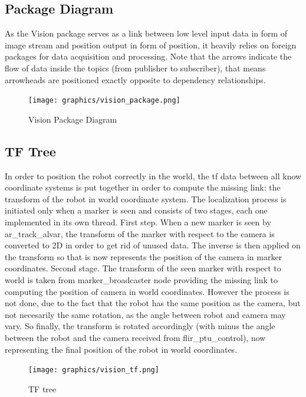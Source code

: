 \subsection{Package Diagram}
As the Vision package serves as a link between low level input data in form of image stream and position output in form of position, it heavily relies on foreign packages for data acquisition and processing. Note that the arrows indicate the flow of data inside the topics (from publisher to subscriber), that means arrowheads are positioned exactly opposite to dependency relationships.

\begin{figure}
\begin{center}
\texttt{[image: graphics/vision\_package.png]}
\caption{Vision Package Diagram}
\label{Flow of data between packages}
\end{center}
\end{figure}

\subsection{TF Tree}
In order to position the robot correctly in the world, the tf data between all know coordinate systems is put together in order to compute the missing link: the transform of the robot in world coordinate system. The localization process is initiated only when a marker is seen and consists of two stages, each one implemented in its own thread. First step. When a new marker is seen by ar\_track\_alvar, the transform of the marker with respect to the camera is converted to 2D in order to get rid of unused data. The inverse is then applied on the transform so that is now represents the position of the camera in marker coordinates. Second stage. The transform of the seen marker with respect to world is taken from marker\_broadcaster node providing the missing link to computing the position of camera in world coordinates. However the process is not done, due to the fact that the robot has the same position as the camera, but not necesarily the same rotation, as the angle between robot and camera may vary. So finally, the transform is rotated accordingly (with minus the angle between the robot and the camera received from flir\_ptu\_control), now representing the final position of the robot in world coordinates.

\begin{figure}
\begin{center}
\texttt{[image: graphics/vision\_tf.png]}
\caption{TF tree}
\label{TF tree used during localization computation}
\end{center}
\end{figure}

